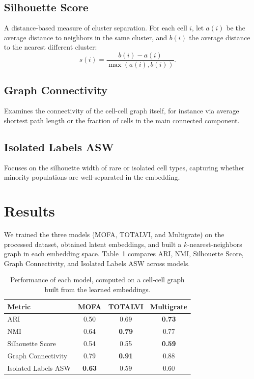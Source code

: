 \documentclass{article}
\begin{document}
\subsection{Silhouette Score}
A distance-based measure of cluster separation. For each cell \(i\), let \(a(i)\) be the average distance 
to neighbors in the same cluster, and \(b(i)\) the average distance to the nearest different cluster:
\[
s(i) = \frac{b(i) - a(i)}{\max(a(i), b(i))}.
\]

\subsection{Graph Connectivity}
Examines the connectivity of the cell-cell graph itself, for instance via average shortest path length 
or the fraction of cells in the main connected component.

\subsection{Isolated Labels ASW}
Focuses on the silhouette width of rare or isolated cell types, capturing whether minority populations 
are well-separated in the embedding.

\section{Results}
We trained the three models (MOFA, TOTALVI, and Multigrate) on the processed dataset, 
obtained latent embeddings, and built a \(k\)-nearest-neighbors graph in each embedding space. 
Table~\ref{tab:results} compares ARI, NMI, Silhouette Score, Graph Connectivity, 
and Isolated Labels ASW across models.

\begin{table}[H]
\centering
\begin{tabular}{lccc}
\toprule
\textbf{Metric} & \textbf{MOFA} & \textbf{TOTALVI} & \textbf{Multigrate} \\
\midrule
ARI                   & 0.50 & 0.69 & \textbf{0.73} \\
NMI                   & 0.64 & \textbf{0.79} & 0.77 \\
Silhouette Score      & 0.54 & 0.55 & \textbf{0.59} \\
Graph Connectivity    & 0.79 & \textbf{0.91} & 0.88 \\
Isolated Labels ASW   & \textbf{0.63} & 0.59 & 0.60 \\
\bottomrule
\end{tabular}
\caption{Performance of each model, computed on a cell-cell graph built from the learned embeddings.}
\label{tab:results}
\end{table}
\end{document}

